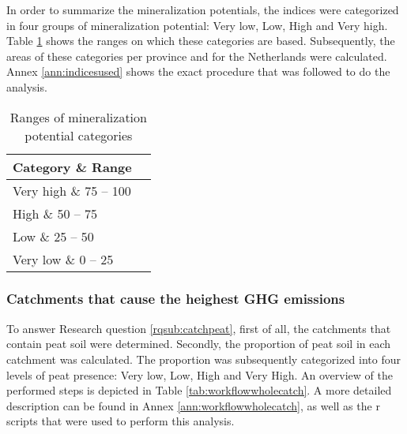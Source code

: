 \documentclass[a4paper,12pt]{scrbook}
\begin{document}
In order to summarize the mineralization potentials, the indices were categorized in four groups of mineralization potential: Very low, Low, High and Very high. Table \ref{tab:minpotcatranges} shows the ranges on which these categories are based. Subsequently, the areas of these categories per province and for the Netherlands were calculated. Annex \ref{ann:indicesused} shows the exact procedure that was followed to do the analysis.

\begin{table}[htbp]
\caption{Ranges of mineralization potential categories}
\begin{center}
\begin{tabular}{|l|l|}
\hline
Category \& Range \\ \hline
Very high \& 75 – 100 \\%
High \& 50 – 75 \\%
Low \& 25 – 50 \\%
Very low \& 0 – 25 \\%
\end{tabular}
\end{center}
\label{tab:minpotcatranges}
\end{table}



\subsubsection{Catchments that cause the heighest GHG emissions}

To answer Research question \ref{rqsub:catchpeat}, first of all, the catchments that contain peat soil were determined. Secondly, the proportion of peat soil in each catchment was calculated. The proportion was subsequently categorized into four levels of peat presence: Very low, Low, High and Very High. An overview of the performed steps is depicted in Table \ref{tab:workflowwholecatch}. A more detailed description can be found in Annex \ref{ann:workflowwholecatch}, as well as the r scripts that were used to perform this analysis.
\end{document}
